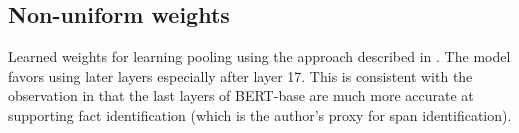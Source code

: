 \newpage

\subsection{Non-uniform weights}
\label{apdx:non-uniform}

Learned weights for learning pooling using the approach described in \cite{tenney-etal-2019-bert}. The model favors using later layers especially after layer 17. This is consistent with the observation in \cite{van_Aken_2019} that the last layers of BERT-base are much more accurate at supporting fact identification (which is the author’s proxy for span identification).

